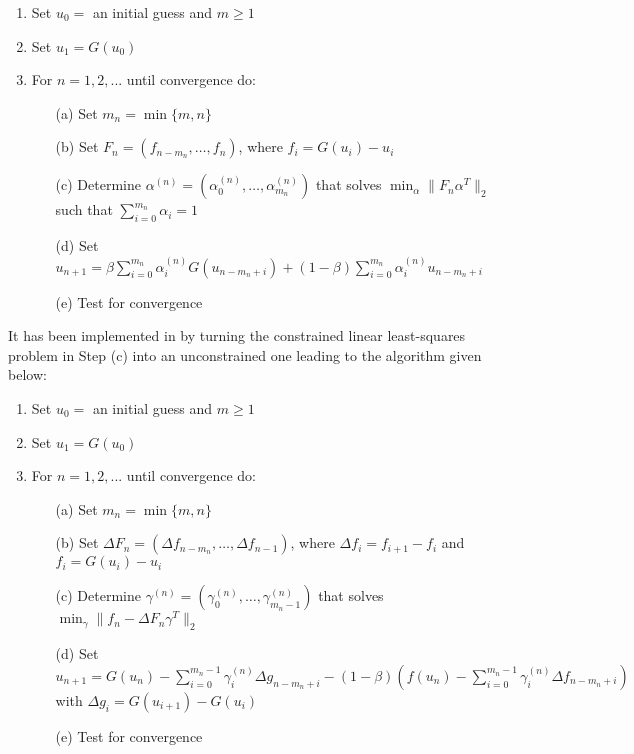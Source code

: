 \vspace{1ex}
\begin{enumerate}
   \item Set $u_0 = $ an initial guess and $m \ge 1$
   \item Set $u_1 = G(u_0)$
   \item For $n = 1, 2,...$ until convergence do:
      \begin{itemize}
          \item[(a)] Set $m_n = \min\{m,n\}$
          \item[(b)] Set $F_{n} = (f_{n-m_n}, \ldots, f_n)$, where $f_i=G(u_i)-u_i$
          \item[(c)] Determine $\alpha^{(n)} = (\alpha_0^{(n)}, \ldots, \alpha_{m_n}^{(n)})$ that solves
            $\min_\alpha  \| F_n \alpha^T \|_2$ such that $\sum_{i=0}^{m_n} \alpha_i = 1$
          \item[(d)] Set $u_{n+1} = \beta \sum_{i=0}^{m_n} \alpha_i^{(n)} G(u_{n-m_n+i}) +
            (1-\beta) \sum_{i=0}^{m_n} \alpha_i^{(n)} u_{n-m_{n}+i}$
          \item[(e)] Test for convergence
      \end{itemize}
\end{enumerate}

It has been implemented in {\kinsol} by turning the constrained linear least-squares
problem in Step (c) into an unconstrained one leading to the algorithm given below:

\vspace{1ex}
\begin{enumerate}
   \item Set $u_0 = $ an initial guess and $m \ge 1$
   \item Set $u_1 = G(u_0)$
   \item For $n = 1, 2,...$ until convergence do:
      \begin{itemize}
          \item[(a)] Set $m_n = \min\{m,n\}$
          \item[(b)] Set $\Delta F_{n} = (\Delta f_{n-m_n}, \ldots, \Delta f_{n-1})$,
            where $\Delta f_i = f_{i+1} - f_i$ and $f_i=G(u_i)-u_i$
          \item[(c)] Determine $\gamma^{(n)} = (\gamma_0^{(n)}, \ldots, \gamma_{m_n-1}^{(n)})$
            that solves $\min_\gamma  \| f_n - \Delta F_n \gamma^T \|_2$
          \item[(d)] Set $u_{n+1} = G(u_n)-\sum_{i=0}^{m_n-1} \gamma_i^{(n)}
            \Delta g_{n-m_n+i} - (1-\beta)(f(u_n) - \sum_{i=0}^{m_n-1} \gamma_i^{(n)} \Delta f_{n-m_n+i})$ with
            $\Delta g_i = G(u_{i+1}) - G(u_i)$
          \item[(e)] Test for convergence
      \end{itemize}
\end{enumerate}

